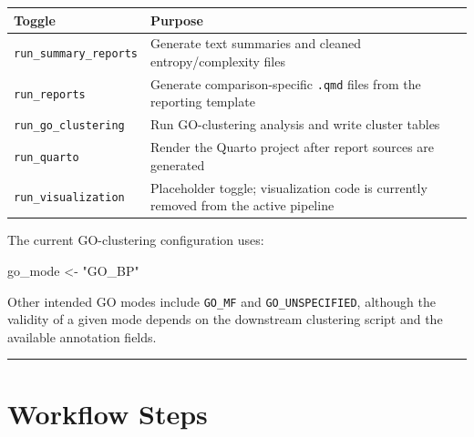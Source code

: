 \documentclass[
  letterpaper,
  DIV=11,
  numbers=noendperiod,
  openany,
  oneside]{scrreprt}
\newenvironment{Shaded}{\begin{snugshade}}{\end{snugshade}}
\newcommand{\NormalTok}[1]{\textcolor[rgb]{0.00,0.23,0.31}{#1}}
\newcommand{\OtherTok}[1]{\textcolor[rgb]{0.00,0.23,0.31}{#1}}
\newcommand{\StringTok}[1]{\textcolor[rgb]{0.13,0.47,0.30}{#1}}
\begin{document}
\begin{longtable}[]{@{}
  >{\raggedright\arraybackslash}p{}
  >{\raggedright\arraybackslash}p{}@{}}
\toprule\noalign{}
\begin{minipage}[b]{\linewidth}\raggedright
Toggle
\end{minipage} & \begin{minipage}[b]{\linewidth}\raggedright
Purpose
\end{minipage} \\
\midrule\noalign{}
\endhead
\bottomrule\noalign{}
\endlastfoot
\texttt{run\_summary\_reports} & Generate text summaries and cleaned
entropy/complexity files \\
\texttt{run\_reports} & Generate comparison-specific \texttt{.qmd} files
from the reporting template \\
\texttt{run\_go\_clustering} & Run GO-clustering analysis and write
cluster tables \\
\texttt{run\_quarto} & Render the Quarto project after report sources
are generated \\
\texttt{run\_visualization} & Placeholder toggle; visualization code is
currently removed from the active pipeline \\
\end{longtable}

The current GO-clustering configuration uses:

\begin{Shaded}
\begin{Highlighting}[]
\NormalTok{go\_mode }\OtherTok{\textless{}{-}} \StringTok{"GO\_BP"}
\end{Highlighting}
\end{Shaded}

Other intended GO modes include \texttt{GO\_MF} and
\texttt{GO\_UNSPECIFIED}, although the validity of a given mode depends
on the downstream clustering script and the available annotation fields.

\begin{center}\rule{0.5\linewidth}{0.5pt}\end{center}

\section*{Workflow Steps}\label{workflow-steps-2}

\end{document}
